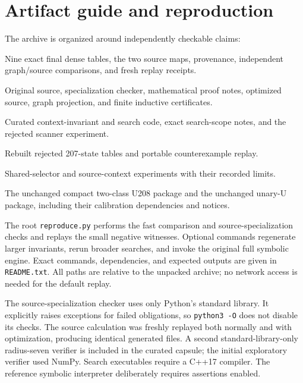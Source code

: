 \documentclass[11pt,a4paper]{article}
\theoremstyle{definition}
\newcommand{\file}[1]{\nolinkurl{#1}}
\begin{document}
\appendix
\section{Artifact guide and reproduction}

The archive is organized around independently checkable claims:
\begin{description}[leftmargin=0pt,labelindent=0pt]
\item[\file{audit/}] Nine exact final dense tables, the two source maps, provenance, independent graph/source comparisons, and fresh replay receipts.
\item[\file{source_optimization/}] Original source, specialization checker, mathematical proof notes, optimized source, graph projection, and finite inductive certificates.
\item[\file{context_research/}] Curated context-invariant and search code, exact search-scope notes, and the rejected scanner experiment.
\item[\file{rotation_repair/}] Rebuilt rejected 207-state tables and portable counterexample replay.
\item[\file{additional_search/}] Shared-selector and source-context experiments with their recorded limits.
\item[\file{references/}] The unchanged compact two-class U208 package and the unchanged unary-U package, including their calibration dependencies and notices.
\end{description}

The root \file{reproduce.py} performs the fast comparison and source-specialization checks and replays the small negative witnesses. Optional commands regenerate larger invariants, rerun broader searches, and invoke the original full symbolic engine. Exact commands, dependencies, and expected outputs are given in \file{README.txt}. All paths are relative to the unpacked archive; no network access is needed for the default replay.

The source-specialization checker uses only Python's standard library. It explicitly raises exceptions for failed obligations, so \file{python3 -O} does not disable its checks. The source calculation was freshly replayed both normally and with optimization, producing identical generated files. A second standard-library-only radius-seven verifier is included in the curated capsule; the initial exploratory verifier used NumPy. Search executables require a C++17 compiler. The reference symbolic interpreter deliberately requires assertions enabled.
\end{document}
